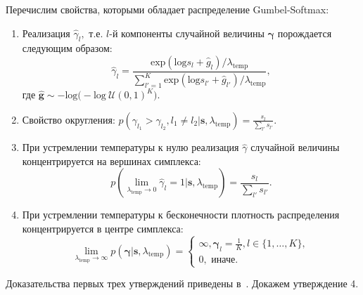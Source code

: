 Перечислим свойства, которыми обладает распределение Gumbel-Softmax:
\begin{enumerate}
\item Реализация $\hat{\gamma}_l,$ т.е. $l$-й компоненты случайной величины $\boldsymbol{\gamma}$ порождается следующим образом:
\[
    \hat{\gamma}_l = \frac{\text{exp}(\text{log}s_l+\hat{g}_l)/\lambda_{\text{temp}}}{\sum_{l'=1}^{K}\text{exp}(\text{log}s_{l'}+\hat{g}_{l'})/\lambda_{\text{temp}}},
\]
где $\hat{\mathbf{g}} \sim -\text{log}\bigl(-\text{log}~\mathcal{U}(0,1)^K\bigr).$ 

\item Свойство округления: $p(\gamma_{l_1} > \gamma_{l_2}, l_1\neq l_2|\mathbf{s}, {\lambda}_\text{temp}) = \frac{s_l}{\sum_{l'}s_{l'}}.$

\item При устремлении температуры к нулю реализация $\hat{\gamma}$ случайной величины концентрируется на вершинах симплекса:
\[
p(\lim_{\lambda_{\text{temp}}\to 0}\hat{\gamma}_{l}= 1|\mathbf{s}, {\lambda}_\text{temp})=\frac{s_l}{\sum_{l'}s_{l'}}.
\]


\item При устремлении температуры к бесконечности плотность распределения концентрируется в центре симплекса:
\begin{equation}
\label{eq:theorem_gs}
    \lim_{\lambda_{\text{temp}} \to \infty}  p(\boldsymbol{\gamma}|\mathbf{s}, {\lambda}_\text{temp}) = 
    \begin{cases}
    \infty, \boldsymbol{\gamma}_l = \frac{1}{K}, l \in \{1,\dots,K\},\\
    0, \text{ иначе.}
    \end{cases}
\end{equation}
\end{enumerate}

Доказательства первых трех утверждений приведены в~\cite{gumbel}. Докажем утверждение 4.


